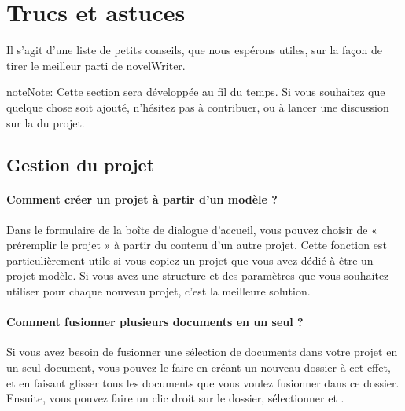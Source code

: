 \documentclass[a4paper,11pt,french]{sphinxmanual}
\begin{document}
\sphinxstepscope


\chapter{Trucs et astuces}
\label{\detokenize{int_howto:tips-tricks}}\label{\detokenize{int_howto:a-howto}}\label{\detokenize{int_howto::doc}}
\sphinxAtStartPar
Il s’agit d’une liste de petits conseils, que nous espérons utiles, sur la façon de tirer le meilleur parti de novelWriter.

\begin{sphinxadmonition}{note}{Note:}
\sphinxAtStartPar
Cette section sera développée au fil du temps. Si vous souhaitez que quelque chose soit ajouté, n’hésitez pas à contribuer, ou à lancer une discussion sur la  du projet.
\end{sphinxadmonition}


\section{Gestion du projet}
\label{\detokenize{int_howto:managing-the-project}}\subsubsection*{Comment créer un projet à partir d’un modèle ?}

\sphinxAtStartPar
Dans le formulaire  de la boîte de dialogue d’accueil, vous pouvez choisir de « pré\sphinxhyphen{}remplir le projet » à partir du contenu d’un autre projet. Cette fonction est particulièrement utile si vous copiez un projet que vous avez dédié à être un projet modèle. Si vous avez une structure et des paramètres que vous souhaitez utiliser pour chaque nouveau projet, c’est la meilleure solution.
\subsubsection*{Comment fusionner plusieurs documents en un seul ?}

\sphinxAtStartPar
Si vous avez besoin de fusionner une sélection de documents dans votre projet en un seul document, vous pouvez le faire en créant un nouveau dossier à cet effet, et en faisant glisser tous les documents que vous voulez fusionner dans ce dossier. Ensuite, vous pouvez faire un clic droit sur le dossier, sélectionner  et .
\end{document}
